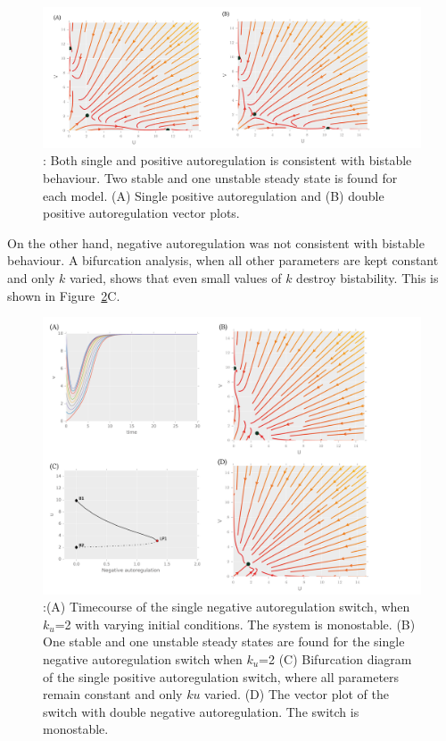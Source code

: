 \begin{figure}[htbp]
	\begin{center}
\includegraphics[scale=0.6]{../../chapters/chapterABCSysBio/images/gard_pos.png}
\caption[LoF caption]{\label{fig:Gard_pos}: Both single and positive autoregulation is consistent with bistable behaviour. Two stable and one unstable steady state is found for each model. (A) Single positive autoregulation and (B) double positive autoregulation vector plots.}
\end{center}
\end{figure}

On the other hand, negative autoregulation was not consistent with bistable behaviour. A bifurcation analysis, when all other parameters are kept constant and only $k$ varied, shows that  even small values of $k$ destroy bistability. This is shown in Figure~\ref{fig:Gard_neg}C. 
\begin{figure}[htbp]
	\begin{center}
\includegraphics[scale=0.7]{../../chapters/chapterABCSysBio/images/gard_neg.png}
\caption[LoF caption]{\label{fig:Gard_neg}:(A) Timecourse of the single negative autoregulation switch, when $k_u$=2 with varying initial conditions. The system is monostable. (B) One stable and one unstable steady states are found for the single negative autoregulation switch when $k_u$=2 (C) Bifurcation diagram of the single positive autoregulation switch, where all parameters remain constant and only $ku$ varied. (D) The vector plot of the switch with double negative autoregulation. The switch is monostable.}
\end{center}
\end{figure}




